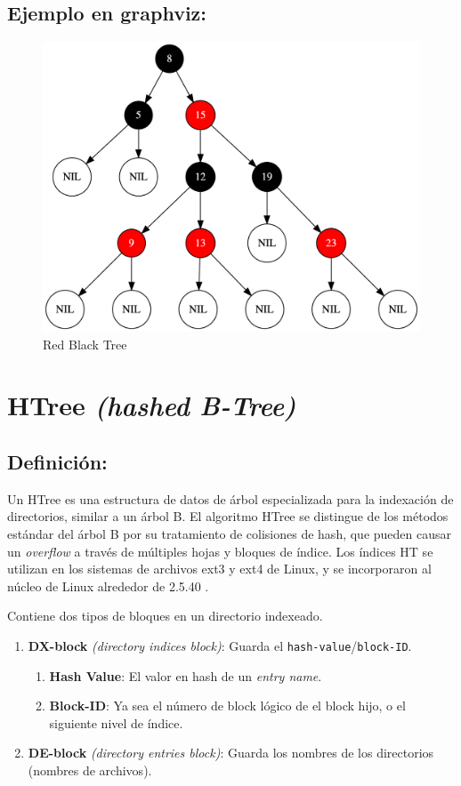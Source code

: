 \documentclass[]{article}
\begin{document}
	\subsection{Ejemplo en graphviz:}
		\begin{figure}[H]
			\centering\includegraphics[width=\textwidth]{graphviz/redBlackTree.png}
			\caption{Red Black Tree}
			\label{fig:Red Black Tree}
		\end{figure}
	
\section{HTree \textit{(hashed B-Tree)}}
	\subsection{Definición:}
		\par Un HTree es una estructura de datos de árbol especializada para la indexación de directorios, similar a un árbol B. El algoritmo HTree se distingue de los métodos estándar del árbol B por su tratamiento de colisiones de hash, que pueden causar un \textit{overflow} a través de múltiples hojas y bloques de índice. Los índices HT se utilizan en los sistemas de archivos ext3 y ext4 de Linux, y se incorporaron al núcleo de Linux alrededor de 2.5.40 \cite{tytsoAddExt3Indexed2002}.
		
		\par Contiene dos tipos de bloques en un directorio indexeado.
			\begin{enumerate}
				\item \textbf{DX-block} \textit{(directory indices block)}: Guarda el \texttt{hash-value}/\texttt{block-ID}.
				\begin{enumerate}
					\item \textbf{Hash Value}: El valor en hash de un \textit{entry name}.
					\item \textbf{Block-ID}: Ya sea el número de block lógico de el block hijo, o el siguiente nivel de índice.
				\end{enumerate}
			\item \textbf{DE-block} \textit{(directory entries block)}: Guarda los nombres de los directorios (nombres de archivos).
			\end{enumerate}
\end{document}
